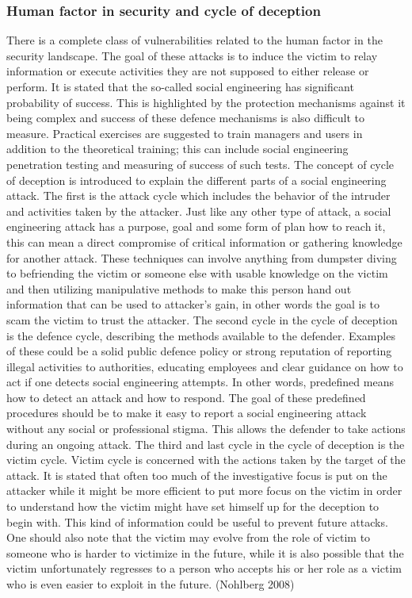 \documentclass{article}
\begin{document}
\subsubsection{Human factor in security and cycle of deception}
There is a complete class of vulnerabilities related to the human factor in the security landscape. The goal of these attacks is to induce the victim to relay information or execute activities they are not supposed to either release or perform.
It is stated that the so-called social engineering has significant probability of success. This is highlighted by the protection mechanisms against it being complex and success of these defence mechanisms is also difficult to measure.
Practical exercises are suggested to train managers and users in addition to the theoretical training; this can include social engineering penetration testing and measuring of success of such tests.
The concept of cycle of deception is introduced to explain the different parts of a social engineering attack. The first is the attack cycle which includes the behavior of the intruder and activities taken by the attacker. Just like any other type of attack, a social engineering attack has a purpose, goal and some form of plan how to reach it, this can mean a direct compromise of critical information or gathering knowledge for another attack. These techniques can involve anything from dumpster diving to befriending the victim or someone else with usable knowledge on the victim and then utilizing manipulative methods to make this person hand out information that can be used to attacker's gain, in other words the goal is to scam the victim to trust the attacker. 
The second cycle in the cycle of deception is the defence cycle, describing the methods available to the defender. Examples of these could be a solid public defence policy or strong reputation of reporting illegal activities to authorities, educating employees and clear guidance on how to act if one detects social engineering attempts. In other words, predefined means how to detect an attack and how to respond. The goal of these predefined procedures should be to make it easy to report a social engineering attack without any social or professional stigma. This allows the defender to take actions during an ongoing attack.
The third and last cycle in the cycle of deception is the victim cycle. Victim cycle is concerned with the actions taken by the target of the attack. It is stated that often too much of the investigative focus is put on the attacker while it might be more efficient to put more focus on the victim in order to understand how the victim might have set himself up for the deception to begin with. This kind of information could be useful to prevent future attacks. One should also note that the victim may evolve from the role of victim to someone who is harder to victimize in the future, while it is also possible that the victim unfortunately regresses to a person who accepts his or her role as a victim who is even easier to exploit in the future. (Nohlberg 2008)
\end{document}
